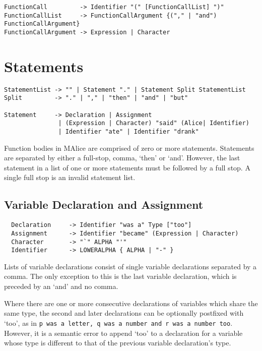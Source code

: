 \documentclass[a4wide, 11pt]{article}
\begin{document}
\begin{verbatim}
FunctionCall         -> Identifier "(" [FunctionCallList] ")"
FunctionCallList     -> FunctionCallArgument {("," | "and") FunctionCallArgument}
FunctionCallArgument -> Expression | Character
\end{verbatim}

\section{Statements}

\begin{verbatim}
StatementList -> "" | Statement "." | Statement Split StatementList
Split         -> "." | "," | "then" | "and" | "but"

Statement     -> Declaration | Assignment
               | (Expression | Character) "said" (Alice| Identifier)
               | Identifier "ate" | Identifier "drank"
\end{verbatim}

Function bodies in MAlice are comprised of zero or more statements. Statements are separated by either a full-stop, comma, `then' or `and'. However, the last statement in a list of one or more statements must be followed by a full stop. A single full stop is an invalid statement list.

\subsection{Variable Declaration and Assignment}

\begin{verbatim}
  Declaration     -> Identifier "was a" Type ["too"]
  Assignment      -> Identifier "became" (Expression | Character)
  Character       -> "`" ALPHA "'"
  Identifier      -> LOWERALPHA { ALPHA | "-" }
\end{verbatim}

Lists of variable declarations consist of single variable declarations separated by a comma. The only exception to this is the last variable declaration, which is preceded by an `and' and no comma.

Where there are one or more consecutive declarations of variables which share the same type, the second and later declarations can be optionally postfixed with `too', as in \texttt{p was a letter, q was a number and r was a number too}. However, it is a semantic error to append `too' to a declaration for a variable whose type is different to that of the previous variable declaration's type.
\end{document}
